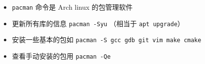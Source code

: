 
\begin{issues}
\issueDraft
\end{issues}

\begin{itemize}
\item \verb|pacman| 命令是 Arch linux 的包管理软件
\item 更新所有库的信息 \verb|pacman -Syu| （相当于 \verb|apt upgrade|）
\item 安装一些基本的包如 \verb|pacman -S gcc gdb git vim make cmake|
\item 查看手动安装的包用 \verb`pacman -Qe`
\end{itemize}
